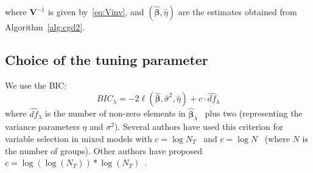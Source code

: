 \documentclass[12pt,letter]{article}\usepackage[]{graphicx}\usepackage[]{color}
\newcommand{\bX}{\textbf{X}}
\newcommand{\bY}{\textbf{Y}}
\newcommand{\bD}{\textbf{D}}
\newcommand{\bDtilde}{\widetilde{\bD}}
\newcommand{\bU}{\textbf{U}}
\newcommand{\bV}{\textbf{V}}
\newcommand{\bb}{\textbf{\emph{b}}}
\newcommand{\bbeta}{\boldsymbol{\beta}}
\newcommand{\bPhi}{\boldsymbol{\Phi}}
\begin{document}
where $\bV^{-1}$ is given by~\eqref{eq:Vinv}, and $(\widehat{\bbeta}, \widehat{\eta})$ are the estimates obtained from Algorithm~\ref{alg:cgd2}.

\subsection{Choice of the tuning parameter}

We use the BIC:
\begin{equation}
	BIC_{\lambda} = -2 \ell(\widehat{\bbeta}, \widehat{\sigma}^2, \widehat{\eta}) + c \cdot \widehat{df}_{\lambda}
\end{equation}
where $\widehat{df}_{\lambda}$ is the number of non-zero elements in $\widehat{\bbeta}_{\lambda}$~\citep{zou2007degrees} plus two (representing the variance parameters $\eta$ and $\sigma^2$). Several authors have used this criterion for variable selection in mixed models with $c = \log N_T$~\citep{bondell2010joint,schelldorfer2011estimation} and $c=\log N$~\citep{ibrahim2011fixed} (where $N$ is the number of groups). Other authors have proposed $c = \log(\log(N_T)) * \log(N_T)$~\citep{wang2009shrinkage}.
\end{document}
